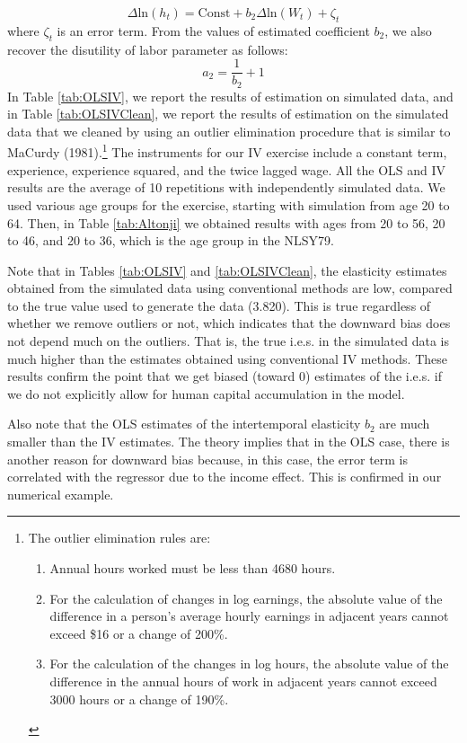 \documentclass{article}
\begin{document}
$$ \Delta \text{ln}(h_t) = \text{Const} + b_2 \Delta \text{ln}(W_t) + \zeta_t$$
where $\zeta_t$ is an error term. From the values of estimated coefficient $b_2$, we also recover the disutility of labor parameter as follows:
$$ a_2 = \dfrac{1}{b_2} + 1 $$
In Table \ref{tab:OLSIV}, we report the results of estimation on simulated data, and in Table \ref{tab:OLSIVClean}, we report the results of estimation on the simulated data that we cleaned by using an outlier elimination procedure that is similar to MaCurdy (1981).\footnote[12]{The outlier elimination rules are:
  \begin{enumerate}
      \item Annual hours worked must be less than 4680 hours.
      \item For the calculation of changes in log earnings, the absolute value of the difference in a person's average hourly earnings in adjacent years cannot exceed \$16 or a change of 200\%.
        \item For the calculation of the changes in log hours, the absolute value of the difference in the annual hours of work in adjacent years cannot exceed 3000 hours or a change of 190\%.
        \end{enumerate}} The instruments for our IV exercise include a constant term, experience, experience squared, and the twice lagged wage. All the OLS and IV results are the average of 10 repetitions with independently simulated data. We used various age groups for the exercise, starting with simulation from age 20 to 64. Then, in Table \ref{tab:Altonji} we obtained results with ages from 20 to 56, 20 to 46, and 20 to 36, which is the age group in the NLSY79. \par
      
      
      Note that in Tables \ref{tab:OLSIV} and \ref{tab:OLSIVClean}, the elasticity estimates obtained from the simulated data using conventional methods are low, compared to the true value used to generate the data (3.820). This is true regardless of whether we remove outliers or not, which indicates that the downward bias does not depend much on the outliers. That is, the true i.e.s. in the simulated data is much higher than the estimates obtained using conventional IV methods. These results confirm the point that we get biased (toward 0) estimates of the i.e.s. if we do not explicitly allow for human capital accumulation in the model. \par
      
      Also note that the OLS estimates of the intertemporal elasticity $b_2$ are much smaller than the IV estimates. The theory implies that in the OLS case, there is another reason for downward bias because, in this case, the error term is correlated with the regressor due to the income effect. This is confirmed in our numerical example. \par
\end{document}
